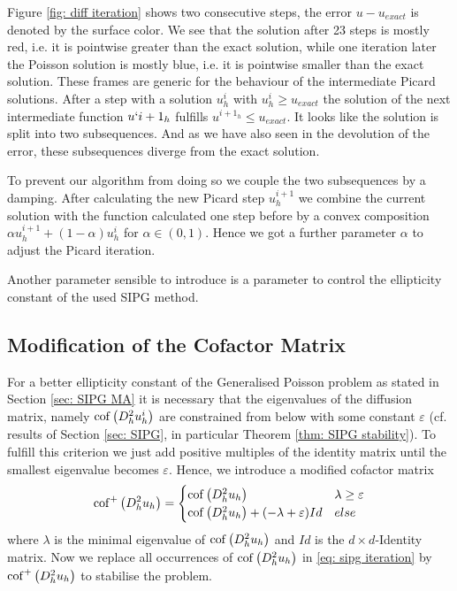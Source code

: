 Figure \ref{fig: diff iteration} shows two consecutive steps, the error $u-u_{exact}$ is denoted by the surface color. We see that the solution after 23 steps is mostly red, i.e. it is pointwise greater than the exact solution, while one iteration later the Poisson solution is mostly blue, i.e. it is pointwise smaller than the exact solution. These frames are generic for the behaviour of the intermediate Picard solutions. After a step with a solution $u_h^i$ with $u_h^i \geq u_{exact}$ the solution of the next intermediate function $u`{i+1}_h$ fulfills $u^{i+1_h} \leq u_{exact}$. It looks like the solution is split into two subsequences.  And as we have also seen in the devolution of the error, these subsequences diverge from the exact solution.

To prevent our algorithm from doing so we couple the two subsequences by a damping. After calculating the new Picard step $u^{i+1}_h$ we combine the current solution with the function calculated one step before by a convex composition $ \alpha u_h^{i+1} + (1- \alpha) u_h^i$ for $\alpha \in (0,1)$. Hence we got a further parameter $\alpha$ to adjust the Picard iteration.

Another parameter sensible to introduce is a parameter to control the ellipticity constant of the used SIPG method.
\subsection{Modification of the Cofactor Matrix}\label{sec: mod cofactor}
For a better ellipticity constant of the Generalised Poisson problem as stated in Section \ref{sec: SIPG MA} it is necessary that the eigenvalues of the diffusion matrix, namely $\operatorname{cof} \left( D_h^2 u_h^i \right)$ are constrained from below with some constant $\varepsilon$ (cf. results of Section \ref{sec: SIPG}, in particular Theorem \ref{thm: SIPG stability}).
To fulfill this criterion we just add positive multiples of the identity matrix until the smallest eigenvalue becomes $\varepsilon$. Hence, we introduce a modified cofactor matrix
\[ 
	\mycofMod {D^2_h u_h} = \begin{cases}
	\mycof {D^2_h u_h} & \lambda \geq \varepsilon	\\
	\mycof {D^2_h u_h}+ (-\lambda+\varepsilon) Id%
	& else
	\end{cases}
\]
where $\lambda$ is the minimal eigenvalue of $ \operatorname{cof} \left( D^2_h u_h \right)$ and $Id$ is the $d \times d$-Identity matrix. 
Now we replace all occurrences of $\operatorname{cof} \left( D^2_h u_h \right)$ in \eqref{eq: sipg iteration} by $\operatorname{cof}^+ \left( D^2_h u_h \right)$ to stabilise the problem.

